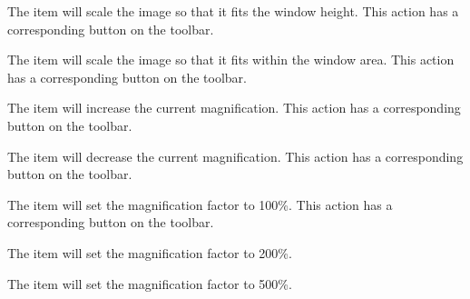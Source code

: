 
The  item will scale the image so
that it fits the window height. This action has a corresponding
button on the toolbar.


The  item will scale the image so
that it fits within the window area. This action has a corresponding
button on the toolbar.


The  item will increase the current
magnification. This action has a corresponding
button on the toolbar.


The  item will decrease the current
magnification. This action has a corresponding
button on the toolbar.


The  item will set the magnification factor to
100\%. This action has a corresponding
button on the toolbar.


The  item will set the magnification factor to
200\%.


The  item will set the magnification factor to
500\%.

